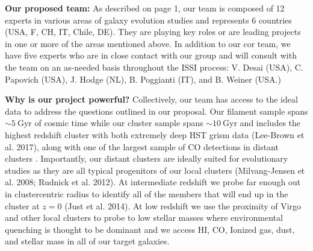 \documentclass[11pt]{article}
\begin{document}

\textbf{Our proposed team:} As described on page 1, our team is composed of 12 experts in various areas of galaxy evolution studies and
represents 6 countries (USA, F, CH, IT, Chile, DE).  They are playing key roles or are leading
projects in one or more of the areas mentioned
above.   In addition to our cor team, we have five experts who are in close contact with our group and will consult with the team on an as-needed basis throughout the ISSI process: V. Desai (USA), C. Papovich (USA), J. Hodge (NL), B. Poggianti (IT), and B. Weiner (USA.)

\textbf{Why is our project powerful?}   Collectively, our team has
access to the ideal data to address the questions outlined in our
proposal.  Our filament sample spans $\sim 5~$Gyr of cosmic time while our cluster sample spans $\sim10~$Gyr and
includes the highest redshift cluster with both extremely deep HST
grism data (Lee-Brown et al. 2017), along with one of the largest sample of CO detections in distant clusters \citep{Rudnick17b, Noble17}.  Importantly, our distant clusters are ideally
suited for evolutionary studies as they are all typical progenitors of
our local clusters (Milvang-Jensen et al. 2008; Rudnick et al. 2012).
At intermediate redshift we probe far enough out in clustercentric
radius to identify all of the members that will end up in the cluster
at $z=0$ (Just et al. 2014).  At low redshift we use the proximity of Virgo and other local clusters to probe to low stellar masses where environmental quenching is thought to be dominant and we access HI, CO, Ionized gas, dust, and stellar mass in all of our target galaxies. 
\end{document}
